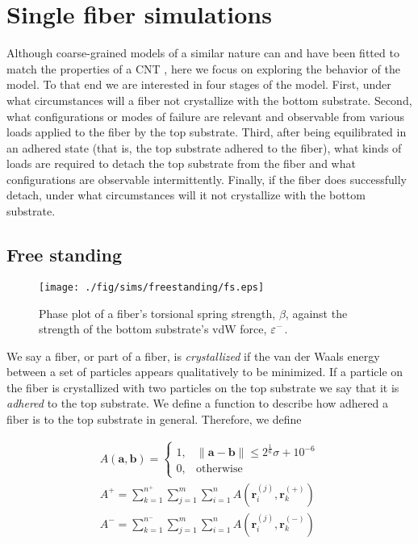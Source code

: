 \chapter{Single fiber simulations} \label{chap:three}

Although coarse-grained models of a similar nature can and have been fitted to match the properties of a CNT \cite{Cranford2010}, here we focus on exploring the behavior of the model. To that end we are interested in four stages of the model. First, under what circumstances will a fiber not crystallize with the bottom substrate. Second, what configurations or modes of failure are relevant and observable from various loads applied to the fiber by the top substrate. Third, after being equilibrated in an adhered state (that is, the top substrate adhered to the fiber), what kinds of loads are required to detach the top substrate from the fiber and what configurations are observable intermittently. Finally, if the fiber does successfully detach, under what circumstances will it not crystallize with the bottom substrate.

\section{Free standing}

	\begin{figure}
		\begin{center}
			\texttt{[image: ./fig/sims/freestanding/fs.eps]}
		\end{center}		
		\caption{Phase plot of a fiber's torsional spring strength, $\beta$, against the strength of the bottom substrate's vdW force, $\varepsilon^-$.
		\label{fig:FreeStandingGrid}}
	\end{figure}	

We say a fiber, or part of a fiber, is \textit{crystallized} if the van der Waals energy between a set of particles appears qualitatively to be minimized. If a particle on the fiber is crystallized with two particles on the top substrate we say that it is \textit{adhered} to the top substrate. We define a function to describe how adhered a fiber is to the top substrate in general. Therefore, we define


\begin{eqnarray}
	A(\textbf{a}, \textbf{b}) = \left\{ 
		\begin{array}{ll}
			1, & \|\textbf{a} - \textbf{b}\| \leq 2^{\frac{1}{6}} \sigma + 10^{-6}\\
			0, & \mbox{otherwise}
		\end{array}
		\right.  \\
	A^+ = \sum_{k=1}^{n^+} \sum_{j=1}^{m} \sum_{i=1}^{n} A(\textbf{r}_i^{(j)},\textbf{r}_k^{(+)}) \label{eqn:adhesion:top} \\ 
	A^- = \sum_{k=1}^{n^-} \sum_{j=1}^{m} \sum_{i=1}^{n} A(\textbf{r}_i^{(j)},\textbf{r}_k^{(-)}) \label{eqn:adhesion:bottom}
\end{eqnarray}


